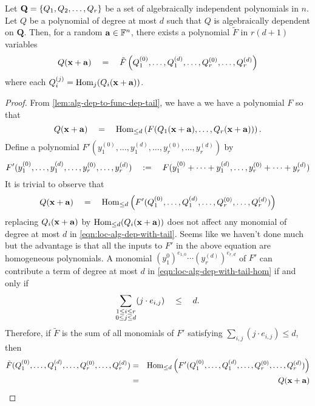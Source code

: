 \begin{lemma}\label{lem:alg-dep-to-func-dep-exact}
Let $\mathbf{Q} = \left\{Q_1, Q_2, \ldots, Q_r\right\}$ be a set of algebraically independent polynomials in $n$.
Let $Q$ be a polynomial of degree at most $d$ such that $Q$ is algebraically dependent on $\mathbf{Q}$.
Then, for a random $\mathbf{a} \in \mathbb{F}^n$, there exists a polynomial $\tilde{F}$ in $r(d+1)$ variables
\[
Q(\mathbf{x} + \mathbf{a}) \quad = \quad \tilde{F}\left(Q_1^{(0)}, \ldots, Q_{1}^{(d)}, \ldots, Q_r^{(0)}, \ldots, Q_r^{(d)}\right)
\]
where each $Q_i^{(j)} = \operatorname{Hom}_j(Q_i(\mathbf{x} + \mathbf{a}))$.
\end{lemma}
\begin{proof}
From \autoref{lem:alg-dep-to-func-dep-tail}, we have a we have a polynomial $F$ so that
\begin{equation}\label{eqn:loc-alg-dep-with-tail}
Q(\mathbf{x} + \mathbf{a}) \quad = \quad \operatorname{Hom}_{\leq d}\left(F(Q_1(\mathbf{x} + \mathbf{a}),\ldots, Q_r(\mathbf{x} + \mathbf{a}))\right). 
\end{equation}
Define a polynomial $F'(y_1^{(0)}, \ldots, y_1^{(d)}, \ldots, y_r^{(0)}, \ldots, y_r^{(d)})$ by
\[
F'(y_1^{(0)}, \ldots, y_1^{(d)}, \ldots, y_r^{(0)}, \ldots, y_r^{(d)}) \quad := \quad F(y_1^{(0)} + \cdots + y_1^{(d)}, \ldots, y_r^{(0)} + \cdots + y_r^{(d)})
\]
It is trivial to observe that
\begin{equation}\label{eqn:loc-alg-dep-with-tail-hom}
Q(\mathbf{x} + \mathbf{a}) \quad = \quad  \operatorname{Hom}_{\leq d}\left(F'(Q_1^{(0)}, \ldots, Q_1^{(d)}, \ldots, Q_r^{(0)}, \ldots, Q_r^{(d)})\right)
\end{equation}
replacing $Q_i(\mathbf{x} + \mathbf{a})$ by $\operatorname{Hom}_{\leq d}(Q_i(\mathbf{x} + \mathbf{a}))$ does not affect any monomial of degree at most $d$ in \eqref{eqn:loc-alg-dep-with-tail}.
Seems like we haven't done much but the advantage is that all the inputs to $F'$ in the above equation are homogeneous polynomials. A monomial $(y_1^{0})^{e_{1,0}} \cdots (y_{r}^{(d)})^{e_{r,d}}$ of $F'$ can contribute a term of degree at most $d$ in \eqref{eqn:loc-alg-dep-with-tail-hom} if and only if 
\[
\sum_{\substack{1\leq i \leq r\\0\leq j \leq d}} (j \cdot e_{i,j}) \quad \leq \quad d.
\]
Therefore, if $\tilde{F}$ is the sum of all monomials of $F'$ satisfying $\sum_{i,j} (j \cdot e_{i,j}) \leq d$, then
\begin{eqnarray*}
\tilde{F}(Q_1^{(0)}, \ldots,Q_1^{(d)}, \ldots, Q_r^{(0)}, \ldots, Q_r^{(d)}) & = &   \operatorname{Hom}_{\leq d}\left(F'(Q_1^{(0)}, \ldots, Q_1^{(d)}, \ldots, Q_r^{(0)}, \ldots, Q_r^{(d)})\right)\\
& = & Q(\mathbf{x} + \mathbf{a})\qedhere
\end{eqnarray*}
\end{proof}


